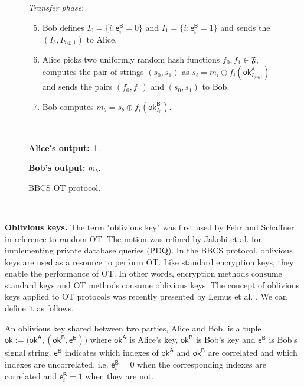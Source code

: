 \begin{figure}[h!]
\begin{tcolorbox}
            \textit{Transfer phase}:
            \begin{enumerate}
            \setcounter{enumi}{4}
                \item Bob defines $I_0 = \{ i : \mathsf{e}^{\mathsf{B}}_i = 0 \}$ and $I_1 = \{ i : \mathsf{e}^{\mathsf{B}}_i = 1 \}$ and sends the $(I_b, I_{b\oplus 1})$ to Alice.
                \item Alice picks two uniformly random hash functions $f_0, f_1 \in \mathfrak{F}$, computes the pair of strings $(s_0, s_1)$ as $s_i = m_i \oplus f_i(\mathsf{ok}^{\mathsf{A}}_{I_{b\oplus i}})$ and sends the pairs $(f_0, f_1)$ and $(s_0, s_1)$ to Bob.
                \item Bob computes $m_b = s_b \oplus  f_i(\mathsf{ok}^{\mathsf{B}}_{I_0})$. 
            \end{enumerate}
            
            \
            
        \textbf{Alice's output:} $\bot$.
        
        \textbf{Bob's output:} $m_b$.
        
        \end{tcolorbox}
    \caption{BBCS OT protocol.}
    \label{fig:BBCS}
\end{figure}

\

\noindent\textbf{Oblivious keys.}  The term "oblivious key" was first used by Fehr and Schaffner \cite{FS09} in reference to random OT. The notion was refined by Jakobi et al. \cite{JSGBBWZ11} for implementing private database queries (PDQ). In the BBCS protocol, oblivious keys are used as a resource to perform OT. Like standard encryption keys, they enable the performance of OT. In other words, encryption methods consume standard keys and OT methods consume oblivious keys. The concept of oblivious keys applied to OT protocols was recently presented by Lemus et al. \cite{Lemus20}. We can define it as follows.

\begin{definition}
An oblivious key shared between two parties, Alice and Bob, is a tuple $\mathsf{ok}:= \big( \mathsf{ok}^{\mathsf{A}}, (\mathsf{ok}^{\mathsf{B}}, \mathsf{e}^{\mathsf{B}}) \big)$ where $\mathsf{ok}^{\mathsf{A}}$ is Alice's key, $\mathsf{ok}^{\mathsf{B}}$ is Bob's key and $\mathsf{e}^{\mathsf{B}}$ is Bob's signal string. $\mathsf{e}^{\mathsf{B}}$ indicates which indexes of $\mathsf{ok}^{\mathsf{A}}$ and $\mathsf{ok}^{\mathsf{B}}$ are correlated and which indexes are uncorrelated, i.e. $\mathsf{e}^{\mathsf{B}}_i = 0$ when the corresponding indexes are correlated and $\mathsf{e}^{\mathsf{B}}_i = 1$ when they are not.
\label{def:ok}
\end{definition}

